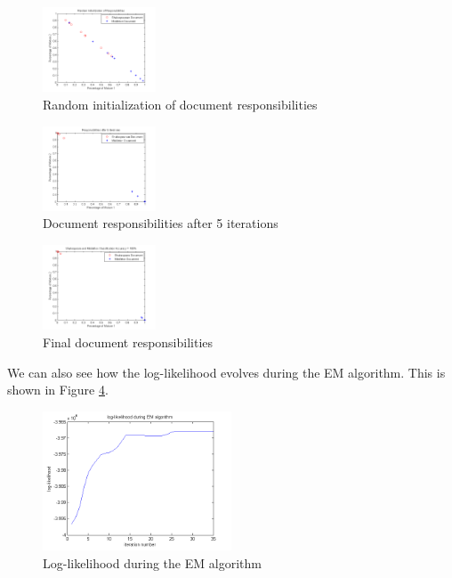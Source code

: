 \documentclass[paper=a4, fontsize=11pt]{scrartcl} %
\begin{document}
\begin{figure}
\centering
\includegraphics[width=0.3\textwidth]{RandInit.png}
\caption{Random initialization of document responsibilities}
\label{fig:randinit}
\end{figure}

\begin{figure}
\centering
\includegraphics[width=0.3\textwidth]{5iter.png}
\caption{Document responsibilities after 5 iterations}
\label{fig:iter}
\end{figure}

\begin{figure}[H]
\centering
\includegraphics[width=0.3\textwidth]{classification_acc.png}
\caption{Final document responsibilities}
\label{fig:classificationacc}
\end{figure}

We can also see how the log-likelihood evolves during the EM algorithm.
This is shown in Figure \ref{fig:ll}.

\begin{figure}
\centering
\includegraphics[width=0.5\textwidth]{log-likelihood.png}
\caption{Log-likelihood during the EM algorithm}
\label{fig:ll}
\end{figure}
\end{document}
